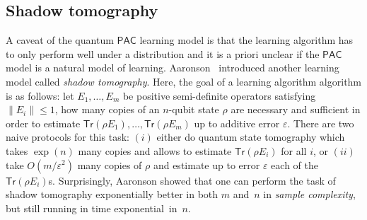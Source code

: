 \documentclass[11pt]{article}
\newcommand{\PAC}{\ensuremath{\mathsf{PAC}}}
\newcommand{\Tr}{\textsf{Tr}}
\begin{document}
\subsection{Shadow tomography}
A caveat of the quantum $\PAC$ learning model is that the learning algorithm has to only perform well under a distribution and it is a priori unclear if the $\PAC$ model is a natural model of learning.  Aaronson~\cite{aaronson:shadow} introduced another learning model called \emph{shadow tomography}. Here, the goal of a learning algorithm algorithm is as follows: let $E_1,\ldots,E_m$ be positive semi-definite operators satisfying $\|E_i\|\leq 1$, how many copies of an $n$-qubit state $\rho$ are necessary and sufficient in order to estimate $\Tr(\rho E_1),\ldots,\Tr(\rho E_m)$ up to additive error $\varepsilon$. There are two naive protocols for this task: $(i)$ either do quantum state tomography which takes $\exp(n)$ many copies and allows to estimate $\Tr(\rho E_i)$ for all $i$, or $(ii)$ take $O(m/\varepsilon^2)$ many copies of $\rho$ and estimate up to error $\varepsilon$ each of the $\Tr(\rho E_i)$s. Surprisingly, Aaronson showed that one can perform the task of shadow tomography exponentially better in both $m$ and~$n$  in \emph{sample complexity}, but still running  in time exponential~in~$n$.
\end{document}

